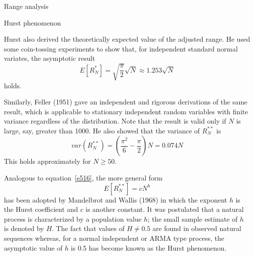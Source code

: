 \documentclass[8pt]{beamer}
\renewcommand{\emph}[1]{\textcolor{myorange}{#1}}
\begin{document}
  \begin{frame}{Range analysis}
    \begin{block}{Hurst phenomenon}
    \end{block}
    \emph{Hurst} also derived the theoretically \emph{expected value} of the \emph{adjusted range}. He used some \emph{coin-tossing experiments} to show that, for independent \emph{standard normal} variates, the asymptotic result
\begin{equation}
    E[R_N^*] = \sqrt{\frac{\pi}{2}} \sqrt{N} \approx 1.253 \sqrt{N}
    \label{e517}
    \end{equation}
    holds. 

    Similarly, \emph{Feller (1951)} gave an independent and rigorous  derivations of the same result, which is applicable to \emph{stationary independent  random variables} with finite variance regardless of the distribution. Note that the result is valid only if $N$ is large, say, greater than 1000. He also showed that the variance of $R_N^{**}$ is 
\begin{equation}
    var(R_N^{**}) = \left(\frac{\pi^2}{6} - \frac{\pi}{2} \right) N = 0.074N
    \label{e518}
    \end{equation}
    This holds approximately for $N\geq 50$.

    Analogous to equation~\ref{e516}, the more general form
\begin{equation}
    E[R_N^{**}] = cN^h
    \label{e519}
    \end{equation}
    has been adopted by \emph{Mandelbrot and Wallis (1968)} in which the exponent $h$ is the \emph{Hurst coefficient} and $c$ is another constant. It was postulated that a \emph{natural process} is characterized by a population value $h$; the small sample estimate of $h$ is denoted by $H$. The fact that values of $H \ne 0.5$ are found in \emph{observed natural sequences}  whereas, for a \emph{normal independent} or \emph{ARMA} type process, the asymptotic value of $h$ is 0.5 has become known as the \alert{Hurst phenomenon}. 
\end{frame}
\end{document}
